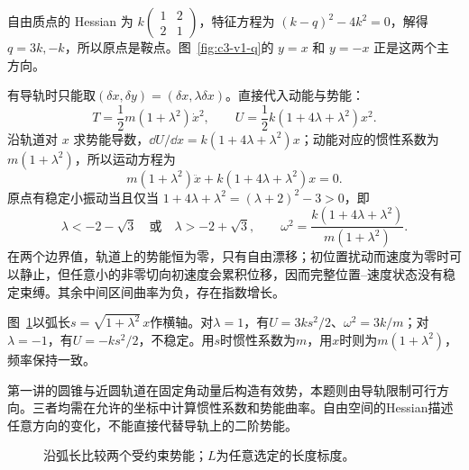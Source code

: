 \begin{solution}
自由质点的 Hessian 为 $k\begin{pmatrix}1&2\\2&1\end{pmatrix}$，特征方程为 $(k-q)^2-4k^2=0$，解得 $q=3k,-k$，所以原点是鞍点。图~\ref{fig:c3-v1-q}的 $y=x$ 和 $y=-x$ 正是这两个主方向。

有导轨时只能取$(\delta x,\delta y)=(\delta x,\lambda\delta x)$。直接代入动能与势能：
\[T=\frac12m(1+\lambda^2)\dot x^2,\qquad
U=\frac12 k(1+4\lambda+\lambda^2)x^2.\]
沿轨道对 $x$ 求势能导数，$\dd U/\dd x=k(1+4\lambda+\lambda^2)x$；动能对应的惯性系数为 $m(1+\lambda^2)$，所以运动方程为
\[m(1+\lambda^2)\ddot x+k(1+4\lambda+\lambda^2)x=0.\]
原点有稳定小振动当且仅当 $1+4\lambda+\lambda^2=(\lambda+2)^2-3>0$，即
\[\boxed{\lambda<-2-\sqrt3\quad\text{或}\quad\lambda>-2+\sqrt3},\qquad
\boxed{\omega^2=\frac{k(1+4\lambda+\lambda^2)}{m(1+\lambda^2)}}.\]
在两个边界值，轨道上的势能恒为零，只有自由漂移；初位置扰动而速度为零时可以静止，但任意小的非零切向初速度会累积位移，因而完整位置--速度状态没有稳定束缚。其余中间区间曲率为负，存在指数增长。

图~\ref{fig:c3-v1-s}以弧长$s=\sqrt{1+\lambda^2}\,x$作横轴。对$\lambda=1$，有$U=3ks^2/2$、$\omega^2=3k/m$；对$\lambda=-1$，有$U=-ks^2/2$，不稳定。用$s$时惯性系数为$m$，用$x$时则为$m(1+\lambda^2)$，频率保持一致。

第一讲的圆锥与近圆轨道在固定角动量后构造有效势，本题则由导轨限制可行方向。三者均需在允许的坐标中计算惯性系数和势能曲率。自由空间的Hessian描述任意方向的变化，不能直接代替导轨上的二阶势能。
\begin{figure}[H]\centering
{}
\caption{沿弧长比较两个受约束势能；$L$为任意选定的长度标度。}\label{fig:c3-v1-s}
\end{figure}
\end{solution}


